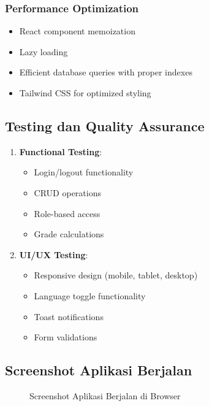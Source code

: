 \documentclass[12pt,a4paper]{article}
\begin{document}
\subsubsection{Performance Optimization}

\begin{itemize}
    \item React component memoization
    \item Lazy loading
    \item Efficient database queries with proper indexes
    \item Tailwind CSS for optimized styling
\end{itemize}

\subsection{Testing dan Quality Assurance}

\begin{enumerate}
    \item \textbf{Functional Testing}:
    \begin{itemize}
        \item Login/logout functionality
        \item CRUD operations
        \item Role-based access
        \item Grade calculations
    \end{itemize}
    
    \item \textbf{UI/UX Testing}:
    \begin{itemize}
        \item Responsive design (mobile, tablet, desktop)
        \item Language toggle functionality
        \item Toast notifications
        \item Form validations
    \end{itemize}
\end{enumerate}

\subsection{Screenshot Aplikasi Berjalan}

\begin{figure}[H]
\centering
{}
\caption{Screenshot Aplikasi Berjalan di Browser}
\end{figure}
\end{document}
